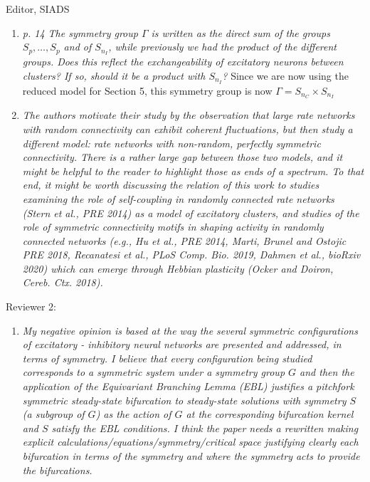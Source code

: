 \documentclass[11pt]{letter}
\begin{document}
\begin{letter}{Editor, SIADS}
\begin{enumerate}
\item \emph{p. 14 The symmetry group $\Gamma$ is written as the direct sum of the groups $S_p, \ldots, S_p$ and of $S_{n_I}$, while previously we had the product of the different groups. Does this reflect the exchangeability of excitatory neurons between clusters? If so, should it be a product with $S_{n_I}$? }
Since we are now using the reduced model for Section 5, this symmetry group is now $\Gamma = S_{n_C} \times S_{n_I}$
\vspace{4mm} 

\item \emph{The authors motivate their study by the observation that large rate networks with random connectivity can exhibit coherent fluctuations, but then study a different model: rate networks with non-random, perfectly symmetric connectivity. There is a rather large gap between those two models, and it might be helpful to the reader to highlight those as ends of a spectrum. To that end, it might be worth discussing the relation of this work to studies examining the role of self-coupling in randomly connected rate networks (Stern et al., PRE 2014) as a model of excitatory clusters, and studies of the role of symmetric connectivity motifs in shaping activity in randomly connected networks (e.g., Hu et al., PRE 2014, Marti, Brunel and Ostojic PRE 2018, Recanatesi et al., PLoS Comp. Bio. 2019, Dahmen et al., bioRxiv 2020) which can emerge through Hebbian plasticity (Ocker and Doiron, Cereb. Ctx. 2018). }
\vspace{4mm} 

\end{enumerate}

Reviewer 2:
\begin{enumerate}
\item \emph{My negative opinion is based at the way the several symmetric configurations of excitatory - inhibitory neural networks are presented and addressed, in terms of symmetry. I believe that every configuration being studied corresponds to a symmetric system under a symmetry group $G$ and then the application of the Equivariant Branching Lemma (EBL) justifies a pitchfork symmetric steady-state bifurcation to steady-state solutions with symmetry $S$ (a subgroup of $G$) as the action of $G$ at the corresponding bifurcation kernel and $S$ satisfy the EBL conditions. I think the paper needs a rewritten making explicit calculations/equations/symmetry/critical space justifying clearly each bifurcation in terms of the symmetry and where the symmetry acts to provide the bifurcations.}
\vspace{4mm} 


\end{enumerate}
\end{letter}
\end{document}

